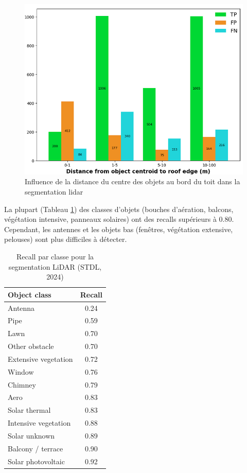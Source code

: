 \begin{figure}[H]
    \centering
    \includegraphics[width=1\linewidth]{02-main//figures/ch2/stdl_07_segmentation_lidar_distances.png}
    \caption{Influence de la distance du centre des objets au bord du toit dans la segmentation \gls{lidar} \cite{herny_detection_2024}}
    \label{fig:stdl_07_segmentation_lidar_distances}
\end{figure}
\newpage
\par{La plupart (Tableau \ref{tab:stdl_03_resultats_segmentation_lidar_classes}) des classes d'objets (bouches d'aération, balcons, végétation intensive, panneaux solaires) ont des recalls supérieurs à 0.80. Cependant, les antennes et les objets bas (fenêtres, végétation extensive, pelouses) sont plus difficiles à détecter.}

\begin{table}[H]
    \centering
    \begin{tabular}{|l|c|}
    \hline
    Object class & Recall \\
    \hline
    Antenna & 0.24 \\
    Pipe & 0.59 \\
    Lawn & 0.70 \\
    Other obstacle & 0.70 \\
    Extensive vegetation & 0.72 \\
    Window & 0.76 \\
    Chimney & 0.79 \\
    Aero & 0.83 \\
    Solar thermal & 0.83 \\
    Intensive vegetation & 0.88 \\
    Solar unknown & 0.89 \\
    Balcony / terrace & 0.90 \\
    Solar photovoltaic & 0.92 \\
    \hline
    \end{tabular}
    \caption{Recall par classe pour la segmentation LiDAR (STDL, 2024)}
    \label{tab:stdl_03_resultats_segmentation_lidar_classes}
\end{table}

